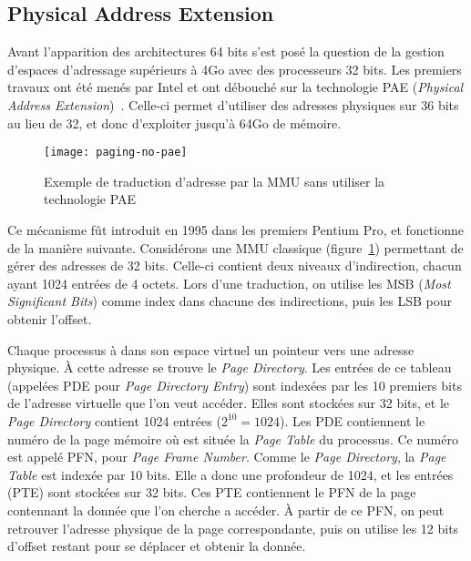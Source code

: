     \subsection{Physical Address Extension}

      Avant l'apparition des architectures 64 bits s'est posé la question de la
      gestion d'espaces d'adressage supérieurs à 4Go avec des processeurs 32
      bits. Les premiers travaux ont été menés par Intel et ont débouché sur la
      technologie PAE (\textit{Physical Address
        Extension})~\citep{patent6349380}. Celle-ci permet d'utiliser des
      adresses physiques sur 36 bits au lieu de 32, et donc d'exploiter jusqu'à
      64Go de mémoire.

      \begin{figure}[ht]
        \centering \texttt{[image: paging-no-pae]}
        \caption{Exemple de traduction d'adresse par la MMU sans utiliser la
          technologie PAE}
        \label{fig:paging-no-pae}
        \end{figure}
      
      Ce mécanisme fût introduit en 1995 dans les premiers Pentium Pro, et
      fonctionne de la manière suivante. Considérons une MMU classique
      (figure~\ref{fig:paging-no-pae}) permettant de gérer des adresses de 32
      bits. Celle-ci contient deux niveaux d'indirection, chacun ayant 1024
      entrées de 4 octets. Lors d'une traduction, on utilise les MSB
      (\textit{Most Significant Bits}) comme index dans chacune des
      indirections, puis les LSB pour obtenir l'offset.

      Chaque processus à dans son espace virtuel un pointeur vers une adresse
      physique. À cette adresse se trouve le \textit{Page Directory}. Les
      entrées de ce tableau (appelées PDE pour \textit{Page Directory Entry})
      sont indexées par les 10 premiers bits de l'adresse virtuelle que l'on
      veut accéder. Elles sont stockées sur 32 bits, et le \textit{Page
        Directory} contient 1024 entrées ($2^{10} = 1024$). Les PDE contiennent
      le numéro de la page mémoire où est située la \textit{Page Table} du
      processus. Ce numéro est appelé PFN, pour \textit{Page Frame
        Number}. Comme le \textit{Page Directory}, la \textit{Page Table} est
      indexée par 10 bits. Elle a donc une profondeur de 1024, et les entrées
      (PTE) sont stockées sur 32 bits. Ces PTE contiennent le PFN de la page
      contennant la donnée que l'on cherche a accéder. À partir de ce PFN, on
      peut retrouver l'adresse physique de la page correspondante, puis on
      utilise les 12 bits d'offset restant pour se déplacer et obtenir la
      donnée.

